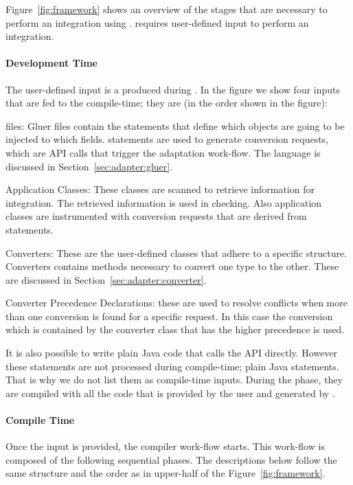 Figure~\ref{fig:framework} shows an overview of the stages that are necessary to perform an integration using \zamk.
\zamk requires user-defined input to perform an integration.

\paragraph{Development Time}
The user-defined input is a produced during . In the figure we show four inputs that are fed to the \zamk compile-time; they are (in the order shown in the figure):

\begin{description}
\item{\gluer files}: Gluer files contain the \gluer statements that define which objects are going to be injected to which fields. \gluer statements are used to generate conversion requests, which are \zamk API calls that trigger the \zamk adaptation work-flow. The \gluer language is discussed in Section~\ref{sec:adapter:gluer}. 
\item{Application Classes}: These classes are scanned to retrieve information for integration. The retrieved information is used in checking. Also application classes are instrumented with conversion requests that are derived from \gluer statements. 
\item{Converters}: These are the user-defined classes that adhere to a specific structure. Converters contains methods necessary to convert one type to the other. These are discussed in Section~\ref{sec:adapter:converter}.
\item{Converter Precedence Declarations}: these are used to resolve conflicts when more than one conversion is found for a specific request. In this case the conversion which is contained by the converter class that has the higher precedence is used. 
\end{description}

It is also possible to write plain Java code that calls the \zamk API directly.
However these statements are not processed during compile-time; plain Java statements. 
That is why we do not list them as compile-time inputs. 
During the  phase, they are compiled with all the code that is provided by the user and generated by \zamk.

\paragraph{Compile Time}
Once the input is provided, the \zamk compiler work-flow starts. This work-flow is composed of the following sequential phases. The descriptions below follow the same structure and the order as in upper-half of the Figure~\ref{fig:framework}. 

